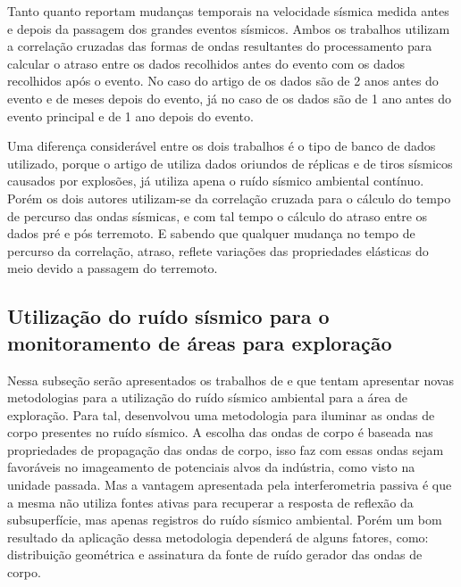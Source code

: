 \documentclass[paper,twocolumn]{geophysics}
\begin{document}
Tanto \cite{li_seismic_2006} quanto \cite{zaccarelli_variations_2011} reportam mudanças temporais na velocidade sísmica medida antes e depois da passagem dos grandes eventos sísmicos. Ambos os trabalhos utilizam a correlação cruzadas das formas de ondas resultantes do processamento para calcular o atraso entre os dados recolhidos antes do evento com os dados recolhidos após o evento. No caso do artigo de \cite{li_seismic_2006} os dados são de 2 anos antes do evento e de meses depois do evento, já no caso de \cite{zaccarelli_variations_2011} os dados são de 1 ano antes do evento principal e de 1 ano depois do evento.

Uma diferença considerável entre os dois trabalhos  é o tipo de banco de dados utilizado, porque o artigo de \cite{li_seismic_2006} utiliza dados oriundos de réplicas e de tiros sísmicos causados por explosões, já \cite{zaccarelli_variations_2011} utiliza apena o ruído sísmico ambiental contínuo. Porém os dois autores utilizam-se da correlação cruzada para o cálculo do tempo de percurso das ondas sísmicas, e com tal tempo o cálculo do atraso entre os dados pré e pós terremoto. E sabendo que qualquer mudança no tempo de percurso da correlação, atraso, reflete variações das propriedades elásticas do meio devido a passagem do terremoto.

\subsection*{Utilização do ruído sísmico para o monitoramento de áreas para exploração}

Nessa subseção serão apresentados os trabalhos de \cite{vidal_retrieval_2014} e \cite{boullenger_studying_2015} que tentam apresentar novas metodologias para a utilização do ruído sísmico ambiental para a área de exploração. Para tal, \cite{vidal_retrieval_2014} desenvolvou uma metodologia para iluminar as ondas de corpo presentes no ruído sísmico. A escolha das ondas de corpo é baseada nas propriedades de propagação das ondas de corpo, isso faz com essas ondas sejam favoráveis no imageamento de potenciais alvos da indústria, como visto na unidade passada. Mas a vantagem apresentada pela interferometria passiva é que a mesma não utiliza fontes ativas para recuperar a resposta de reflexão da subsuperfície, mas apenas registros do ruído sísmico ambiental. Porém um bom resultado da aplicação dessa metodologia dependerá de alguns fatores, como: distribuição geométrica e assinatura da fonte de ruído gerador das ondas de corpo. 
\end{document}
